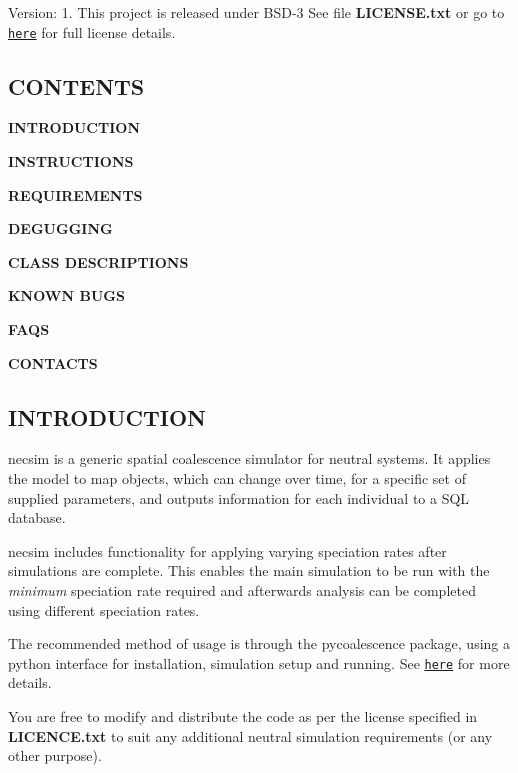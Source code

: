 Version\+: 1. This project is released under B\+S\+D-\/3 See file {\bfseries L\+I\+C\+E\+N\+S\+E.\+txt} or go to \href{https://opensource.org/licenses/BSD-3-Clause}{\tt here} for full license details.

\subsection*{C\+O\+N\+T\+E\+N\+TS}


\begin{DoxyItemize}
\item {\bfseries I\+N\+T\+R\+O\+D\+U\+C\+T\+I\+ON}
\item {\bfseries I\+N\+S\+T\+R\+U\+C\+T\+I\+O\+NS}
\item {\bfseries R\+E\+Q\+U\+I\+R\+E\+M\+E\+N\+TS}
\item {\bfseries D\+E\+G\+U\+G\+G\+I\+NG}
\item {\bfseries C\+L\+A\+SS D\+E\+S\+C\+R\+I\+P\+T\+I\+O\+NS}
\item {\bfseries K\+N\+O\+WN B\+U\+GS}
\item {\bfseries F\+A\+QS}
\item {\bfseries C\+O\+N\+T\+A\+C\+TS}
\end{DoxyItemize}

\subsection*{I\+N\+T\+R\+O\+D\+U\+C\+T\+I\+ON}

necsim is a generic spatial coalescence simulator for neutral systems. It applies the model to map objects, which can change over time, for a specific set of supplied parameters, and outputs information for each individual to a S\+QL database.

necsim includes functionality for applying varying speciation rates after simulations are complete. This enables the main simulation to be run with the {\itshape minimum} speciation rate required and afterwards analysis can be completed using different speciation rates.

The recommended method of usage is through the pycoalescence package, using a python interface for installation, simulation setup and running. See \href{http://pycoalescence.readthedocs.io/}{\tt here} for more details.

You are free to modify and distribute the code as per the license specified in {\bfseries L\+I\+C\+E\+N\+C\+E.\+txt} to suit any additional neutral simulation requirements (or any other purpose).

